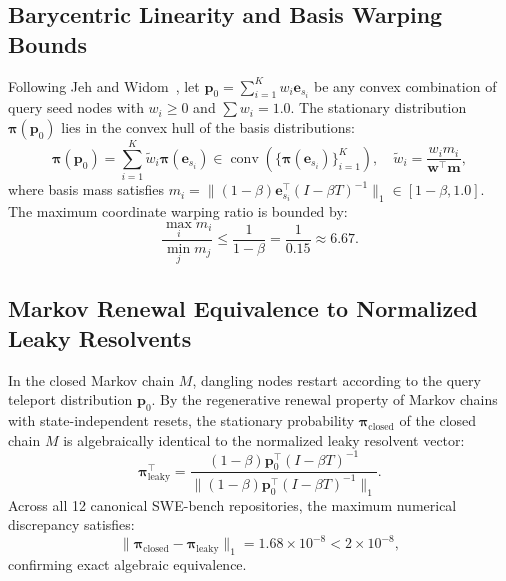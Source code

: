 \documentclass[10pt]{article}
\begin{document}
\subsection{Barycentric Linearity and Basis Warping Bounds}
\label{prop:convex_hull_proof}
Following Jeh and Widom~\cite{jeh2003scaling}, let $\mathbf{p}_0 = \sum_{i=1}^K w_i \mathbf{e}_{s_i}$ be any convex combination of query seed nodes with $w_i \ge 0$ and $\sum w_i = 1.0$. The stationary distribution $\boldsymbol{\pi}(\mathbf{p}_0)$ lies in the convex hull of the basis distributions:
\begin{equation}
\label{eq:convex_hull_weights_app2}
\boldsymbol{\pi}(\mathbf{p}_0) = \sum_{i=1}^K \tilde{w}_i \boldsymbol{\pi}(\mathbf{e}_{s_i}) \in \operatorname{conv}\left(\{\boldsymbol{\pi}(\mathbf{e}_{s_i})\}_{i=1}^K\right), \quad \tilde{w}_i = \frac{w_i m_i}{\mathbf{w}^\top \mathbf{m}},
\end{equation}
where basis mass satisfies $m_i = \|(1-\beta) \mathbf{e}_{s_i}^\top (I - \beta T)^{-1}\|_1 \in [1-\beta, 1.0]$. The maximum coordinate warping ratio is bounded by:
\begin{equation}
\frac{\max_i m_i}{\min_j m_j} \le \frac{1}{1 - \beta} = \frac{1}{0.15} \approx 6.67.
\end{equation}

\subsection{Markov Renewal Equivalence to Normalized Leaky Resolvents}
\label{prop:renewal_proof}
In the closed Markov chain $M$, dangling nodes restart according to the query teleport distribution $\mathbf{p}_0$. By the regenerative renewal property of Markov chains with state-independent resets, the stationary probability $\boldsymbol{\pi}_{\text{closed}}$ of the closed chain $M$ is algebraically identical to the normalized leaky resolvent vector:
\begin{equation}
\boldsymbol{\pi}_{\text{leaky}}^\top = \frac{(1-\beta)\mathbf{p}_0^\top (I - \beta T)^{-1}}{\|(1-\beta)\mathbf{p}_0^\top (I - \beta T)^{-1}\|_1}.
\end{equation}
Across all 12 canonical SWE-bench repositories, the maximum numerical discrepancy satisfies:
\begin{equation}
\|\boldsymbol{\pi}_{\text{closed}} - \boldsymbol{\pi}_{\text{leaky}}\|_1 = 1.68 \times 10^{-8} < 2 \times 10^{-8},
\end{equation}
confirming exact algebraic equivalence.
\end{document}
